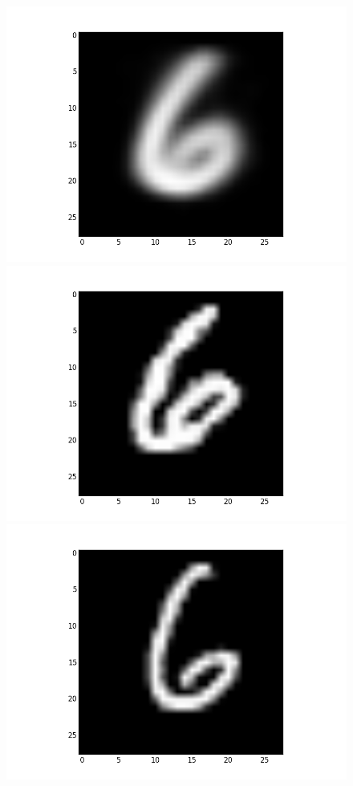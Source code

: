 \documentclass[submit]{harvardml}
\begin{document}
\begin{figure}[ht]
    \centering
    \includegraphics[scale=0.20]{mean-3}
    \includegraphics[scale=0.20]{representative-3-0}
    \includegraphics[scale=0.20]{representative-3-1}

\end{figure}
\end{document}
